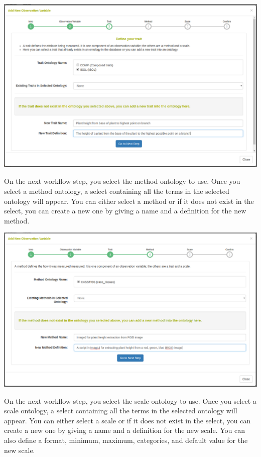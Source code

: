 \documentclass[
  12pt,
]{book}
\begin{document}
\begin{center}\includegraphics[width=0.95\linewidth]{assets/images/manage_observation_variables_workflow_trait} \end{center}

On the next workflow step, you select the method ontology to use. Once you select a method ontology, a select containing all the terms in the selected ontology will appear. You can either select a method or if it does not exist in the select, you can create a new one by giving a name and a definition for the new method.

\begin{center}\includegraphics[width=0.95\linewidth]{assets/images/manage_observation_variables_workflow_method} \end{center}

On the next workflow step, you select the scale ontology to use. Once you select a scale ontology, a select containing all the terms in the selected ontology will appear. You can either select a scale or if it does not exist in the select, you can create a new one by giving a name and a definition for the new scale. You can also define a format, minimum, maximum, categories, and default value for the new scale.
\end{document}
